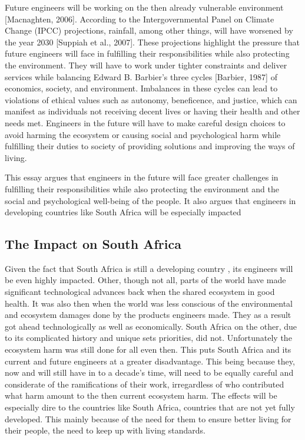 \documentclass[12pt]{witseiepaper}
\begin{document}
    Future engineers will be working on the then already vulnerable environment [Macnaghten, 2006]. According to the Intergovernmental Panel on Climate Change (IPCC) projections, rainfall, among other things, will have worsened by the year 2030 [Suppiah et al., 2007]. These projections highlight the pressure that future engineers will face in fulfilling their responsibilities while also protecting the environment. They will have to work under tighter constraints and deliver services while balancing Edward B. Barbier's three cycles [Barbier, 1987] of economics, society, and environment. Imbalances in these cycles can lead to violations of ethical values such as autonomy, beneficence, and justice, which can manifest as individuals not receiving decent lives or having their health and other needs met. Engineers in the future will have to make careful design choices to avoid harming the ecosystem or causing social and psychological harm while fulfilling their duties to society of providing solutions and improving the ways of living.

    This essay argues that engineers in the future will face greater challenges in fulfilling their responsibilities while also protecting the environment and the social and psychological well-being of the people. It also argues that engineers in developing countries like South Africa will be especially impacted



    \subsection{The Impact on South Africa} 

    Given the fact that South Africa is still a developing country \citep{bakari2018south}, its engineers will be even highly impacted. Other, though not all, parts of the world have made significant technological advances back when the shared ecosystem in good health. It was also then when the world was less conscious of the environmental and ecosystem damages done by the products engineers made. They as a result got ahead technologically as well as economically. South Africa on the other, due to its complicated history and unique sets priorities, did not. Unfortunately the ecosystem harm was still done for all even then. This puts South Africa and its current and future engineers at a greater disadvantage. This being because they, now and will still have in to a decade’s time, will need to be equally careful and considerate of the ramifications of their work, irregardless of who contributed what harm amount to the then current ecosystem harm. 
    The effects will be especially dire to the countries like South Africa, countries that are not yet fully developed. This mainly because of the need for them to ensure better living for their people, the need to keep up with living standards. 
\end{document}
